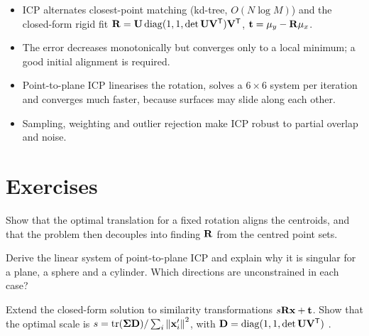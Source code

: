 \begin{keypoints}
\begin{itemize}[leftmargin=*]
  \item ICP alternates closest-point matching (kd-tree, $O(N\log M)$) and the closed-form rigid fit
  $\mathbf{R}=\mathbf{U}\operatorname{diag}(1,1,\det\mathbf{U}\mathbf{V}^{\mathsf{T}})\mathbf{V}^{\mathsf{T}}$, $\mathbf{t}=\mu_y-\mathbf{R}\mu_x$.
  \item The error decreases monotonically but converges only to a local minimum; a good initial
  alignment is required.
  \item Point-to-plane ICP linearises the rotation, solves a $6\times6$ system per iteration and
  converges much faster, because surfaces may slide along each other.
  \item Sampling, weighting and outlier rejection make ICP robust to partial overlap and noise.
\end{itemize}
\end{keypoints}

\section*{Exercises}
\begin{exercise}
Show that the optimal translation for a fixed rotation aligns the centroids, and that the problem
then decouples into finding $\mathbf{R}$ from the centred point sets.
\end{exercise}
\begin{exercise}
Derive the linear system of point-to-plane ICP and explain why it is singular for a plane, a
sphere and a cylinder. Which directions are unconstrained in each case?
\end{exercise}
\begin{exercise}
Extend the closed-form solution to similarity transformations $s\mathbf{R}\mathbf{x}+\mathbf{t}$. Show that the optimal
scale is $s=\operatorname{tr}(\boldsymbol{\Sigma}\mathbf{D})/\sum_i\left\lVert \mathbf{x}'_i\right\rVert^2$, with $\mathbf{D}=\operatorname{diag}(1,1,\det\mathbf{U}\mathbf{V}^{\mathsf{T}})$
\citep{Umeyama1991}.
\end{exercise}
